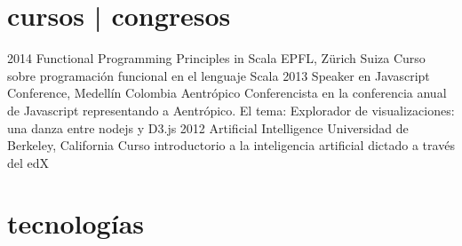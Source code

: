 \documentclass[]{friggeri-cv}
\begin{document}
\section{cursos | congresos}

\begin{entrylist}
  \entry
    {2014}
    {Functional Programming Principles in Scala}
    {EPFL, Zürich Suiza}
    {Curso sobre programación funcional en el lenguaje Scala}
  \entry
    {2013}
    {Speaker en Javascript Conference, Medellín Colombia}
    {Aentrópico}
    {Conferencista en la conferencia anual de Javascript representando a Aentrópico. El tema: Explorador de visualizaciones: una danza entre nodejs y D3.js}
  \entry
    {2012}
    {Artificial Intelligence}
    {Universidad de Berkeley, California}
    {Curso introductorio a la inteligencia artificial dictado a través del edX}
\end{entrylist}


\section{tecnologías}



% 
\end{document}
